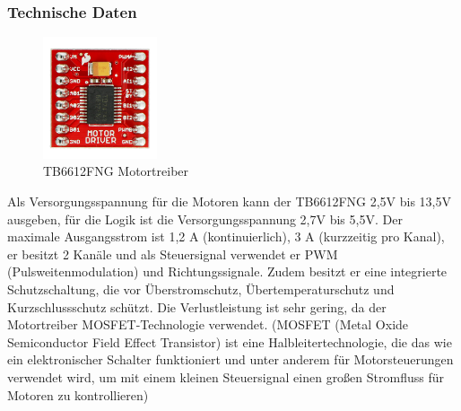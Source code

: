 \subsubsection{Technische Daten}
\begin{figure}[H]
    \centering
    \includegraphics[width=0.3\textwidth]{img/Hardware/Motortreiber.png}
    \caption{TB6612FNG Motortreiber}
    \label{fig:motortreiber}
\end{figure}
Als Versorgungsspannung für die Motoren kann der TB6612FNG 2,5V bis 13,5V ausgeben,
für die Logik ist die Versorgungsspannung 2,7V bis 5,5V.
%
Der maximale Ausgangsstrom ist 1,2 A (kontinuierlich), 3 A (kurzzeitig pro Kanal),
er besitzt 2 Kanäle und als Steuersignal verwendet er PWM (Pulsweitenmodulation) und Richtungssignale.
%
Zudem besitzt er eine integrierte Schutzschaltung,
die vor Überstromschutz, Übertemperaturschutz und Kurzschlussschutz schützt. 
%
Die Verlustleistung ist sehr gering,
da der Motortreiber MOSFET-Technologie verwendet.
%
(MOSFET (Metal Oxide Semiconductor Field Effect Transistor) ist eine Halbleitertechnologie, die 
das wie ein elektronischer Schalter funktioniert und unter anderem für Motorsteuerungen verwendet wird,
um mit einem kleinen Steuersignal einen großen Stromfluss für Motoren zu kontrollieren)
